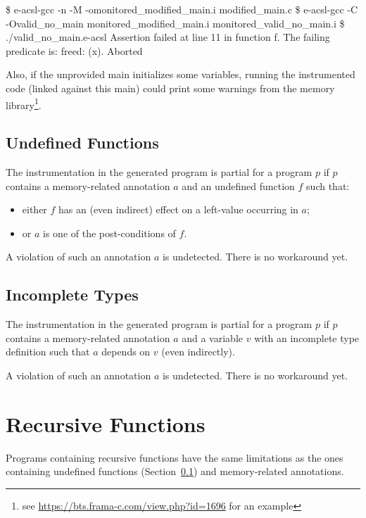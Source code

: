 \begin{logs}
\$ e-acsl-gcc -n -M -omonitored_modified_main.i modified_main.c
\$ e-acsl-gcc -C -Ovalid_no_main monitored_modified_main.i monitored_valid_no_main.i
\$ ./valid_no_main.e-acsl
Assertion failed at line 11 in function f.
The failing predicate is:
freed: \valid(x).
Aborted
\end{logs}

Also, if the unprovided main initializes some variables, running the
instrumented code (linked against this main) could print some warnings from the
\eacsl memory library\footnote{see
  \url{https://bts.frama-c.com/view.php?id=1696} for an example}.

\subsection{Undefined Functions}
\label{sec:limits:no-code}

The instrumentation in the generated program is partial for a program $p$ if $p$
contains a memory-related annotation $a$ and an undefined function
$f$ such that:
\begin{itemize}
\item either $f$ has an (even indirect) effect on a left-value occurring in $a$;
\item or $a$ is one of the post-conditions of $f$.
\end{itemize}
A violation of such an annotation $a$ is undetected. There is no workaround yet.

\subsection{Incomplete Types}

The instrumentation in the generated program is partial for a program $p$ if $p$
contains a memory-related annotation $a$ and a variable $v$ with an incomplete
type definition such that $a$ depends on $v$ (even indirectly).

A violation of such an annotation $a$ is undetected. There is no workaround yet.

\section{Recursive Functions}

Programs containing recursive functions have the same limitations as the ones
containing undefined functions (Section~\ref{sec:limits:no-code}) and
memory-related annotations.

